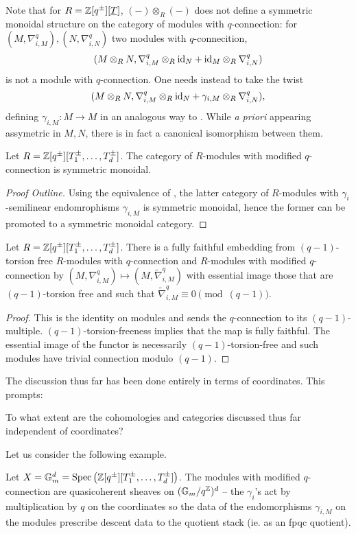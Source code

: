 Note that for $R=\mathbb{Z}[q^{\pm}][\underline{T}]$, $(-)\otimes_{R}(-)$ does not define a symmetric monoidal structure on the category of modules with $q$-connection: for $(M,\nabla_{i,M}^{q}),(N,\nabla_{i,N}^{q})$ two modules with $q$-connecition, $$(M\otimes_{R} N,\nabla_{i,M}^{q}\otimes_{R}\mathrm{id}_{N}+\mathrm{id}_{M}\otimes_{R}\nabla_{i,N}^{q})$$ is not a module with $q$-connection. One needs instead to take the twist $$(M\otimes_{R} N,\nabla_{i,M}^{q}\otimes_{R}\mathrm{id}_{N}+\gamma_{i,M}\otimes_{R}\nabla_{i,N}^{q}),$$
defining $\gamma_{i,M}:M\to M$ in an analogous way to . While \emph{a priori} appearing assymetric in $M,N$, there is in fact a canonical isomorphism between them. 
\begin{proposition}
    Let $R=\mathbb{Z}[q^{\pm}][T_{1}^{\pm},\dots,T_{d}^{\pm}]$. The category of $R$-modules with modified $q$-connection is symmetric monoidal. 
\end{proposition}
\begin{proof}[Proof Outline]
    Using the equivalence of , the latter category of $R$-modules with $\gamma_{i}$-semilinear endomrophisms $\gamma_{i,M}$ is symmetric monoidal, hence the former can be promoted to a symmetric monoidal category. 
\end{proof}
\begin{proposition}
    Let $R=\mathbb{Z}[q^{\pm}][T_{1}^{\pm},\dots,T_{d}^{\pm}]$. There is a fully faithful embedding from $(q-1)$-torsion free $R$-modules with $q$-connection and $R$-modules with modified $q$-connection by $(M,\nabla_{i,M}^{q})\mapsto(M,\widetilde{\nabla}_{i,M}^{q})$ with essential image those that are $(q-1)$-torsion free and such that $\widetilde{\nabla}_{i,M}^{q}\equiv0\pmod{(q-1)}$. 
\end{proposition}
\begin{proof}
    This is the identity on modules and sends the $q$-connection to its $(q-1)$-multiple. $(q-1)$-torsion-freeness implies that the map is fully faithful. The essential image of the functor is necessarily $(q-1)$-torsion-free and such modules have trivial connection modulo $(q-1)$. 
\end{proof}
The discussion thus far has been done entirely in terms of coordinates. This prompts:
\begin{question}
    To what extent are the cohomologies and categories discussed thus far independent of coordinates? 
\end{question}
Let us consider the following example. 
\begin{example}\label{ex: Habiro stack on Gm}
    Let $X=\mathbb{G}_{m}^{d}=\operatorname{Spec}\left(\mathbb{Z}[q^{\pm}][T_{1}^{\pm},\dots,T_{d}^{\pm}]\right)$. The modules with modified $q$-connection are quasicoherent sheaves on $(\mathbb{G}_{m}/q^{\mathbb{Z}})^{d}$ -- the $\gamma_{i}$'s act by multiplication by $q$ on the coordinates so the data of the endomorphisms $\gamma_{i,M}$ on the modules prescribe descent data to the quotient stack (ie. as an fpqc quotient).
\end{example}
